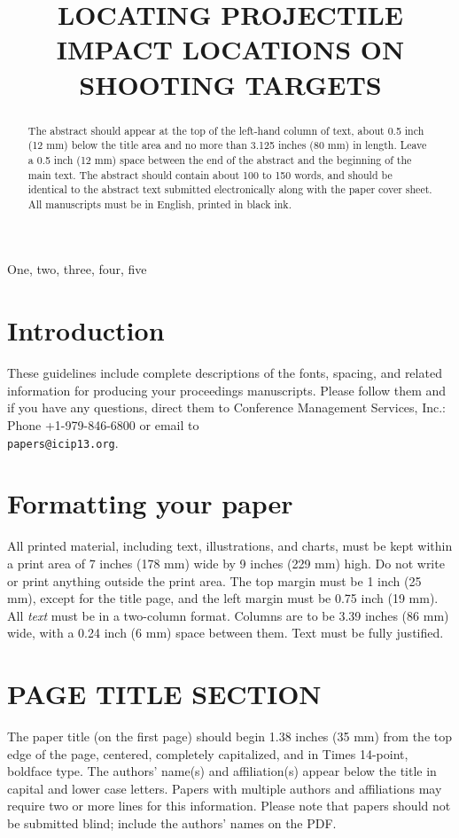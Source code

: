 \documentclass{article}
\title{LOCATING PROJECTILE IMPACT LOCATIONS ON SHOOTING TARGETS}
\begin{document}
%
\maketitle
%
\begin{abstract}
The abstract should appear at the top of the left-hand column of text, about
0.5 inch (12 mm) below the title area and no more than 3.125 inches (80 mm) in
length.  Leave a 0.5 inch (12 mm) space between the end of the abstract and the
beginning of the main text.  The abstract should contain about 100 to 150
words, and should be identical to the abstract text submitted electronically
along with the paper cover sheet.  All manuscripts must be in English, printed
in black ink.
\end{abstract}
%
\begin{keywords}
One, two, three, four, five
\end{keywords}
%
\section{Introduction}
\label{sec:intro}

These guidelines include complete descriptions of the fonts, spacing, and
related information for producing your proceedings manuscripts. Please follow
them and if you have any questions, direct them to Conference Management
Services, Inc.: Phone +1-979-846-6800 or email
to \\\texttt{papers@icip13.org}.

\section{Formatting your paper}
\label{sec:format}

All printed material, including text, illustrations, and charts, must be kept
within a print area of 7 inches (178 mm) wide by 9 inches (229 mm) high. Do
not write or print anything outside the print area. The top margin must be 1
inch (25 mm), except for the title page, and the left margin must be 0.75 inch
(19 mm).  All {\it text} must be in a two-column format. Columns are to be 3.39
inches (86 mm) wide, with a 0.24 inch (6 mm) space between them. Text must be
fully justified.

\section{PAGE TITLE SECTION}
\label{sec:pagestyle}

The paper title (on the first page) should begin 1.38 inches (35 mm) from the
top edge of the page, centered, completely capitalized, and in Times 14-point,
boldface type.  The authors' name(s) and affiliation(s) appear below the title
in capital and lower case letters.  Papers with multiple authors and
affiliations may require two or more lines for this information. Please note
that papers should not be submitted blind; include the authors' names on the
PDF.
\end{document}
